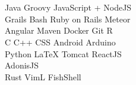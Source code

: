 \documentclass[]{deedy-resume-openfont}
\begin{document}
\begin{minipage}[t]{0.33\textwidth}


\section{\education}

\subsection{\educationMSName}
\descript{\educationMSLocation}
\location{\educationMSDuration}
\educationMSArea
\sectionsep

\subsection{\educationBSName}
\descript{\educationBSLocation}
\location{\educationBSDuration}


\section{\skills}
\subsection{\software}
\location{\softwareProfessional:}
Java \textbullet{} Groovy \textbullet{} JavaScript + NodeJS \textbullet{} \\
Grails \textbullet{} Bash \textbullet{} Ruby on Rails \textbullet{} Meteor \textbullet{} \\
Angular \textbullet{} Maven \textbullet{} Docker \textbullet{} Git \textbullet{} R \\
\location{\softwareProjects:}
C \textbullet{} C++ \textbullet{} CSS \textbullet{} Android \textbullet{} Arduino \\
Python \textbullet{} \LaTeX \textbullet{} Tomcat \textbullet{} ReactJS \textbullet{} \\
AdonisJS \\
\location{\softwareHobby:}
Rust \textbullet{} VimL \textbullet{} FishShell
\sectionsep

\subsection{\languages}
\location{\languagesEN}
\location{\languagesFR}
\location{\languagesJP}
\location{\languagesPT}

\section{\coursework}
\subsection{\courseworkSub}
\courses

%
%

\end{minipage}
\end{document}
